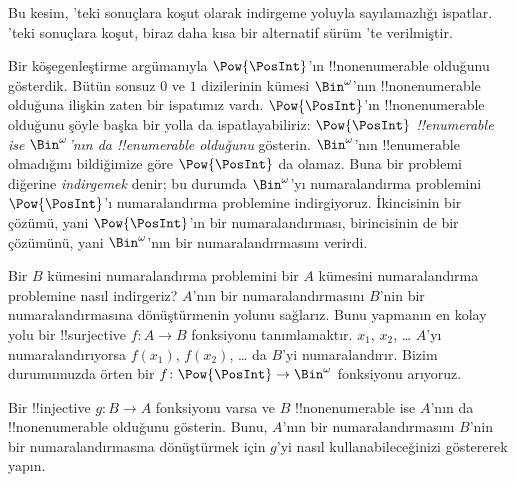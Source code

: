 \documentclass[../../../include/open-logic-section]{subfiles}
\begin{document}


\begin{editorial}
  Bu kesim, 'teki sonuçlara koşut olarak indirgeme yoluyla
  sayılamazlığı ispatlar. 'teki sonuçlara koşut, biraz
  daha kısa bir alternatif sürüm 'te verilmiştir.
\end{editorial}

Bir köşegenleştirme argümanıyla $\Pow{\PosInt}$'ın !!{nonenumerable}
olduğunu gösterdik. Bütün sonsuz $0$ ve $1$ dizilerinin kümesi
$\Bin^\omega$'nın !!{nonenumerable} olduğuna ilişkin zaten bir ispatımız
vardı. $\Pow{\PosInt}$'ın !!{nonenumerable} olduğunu şöyle başka bir yolla
da ispatlayabiliriz: \emph{$\Pow{\PosInt}$ !!{enumerable} ise
$\Bin^\omega$'nın da !!{enumerable} olduğunu} gösterin. $\Bin^\omega$'nın
!!{enumerable} olmadığını bildiğimize göre $\Pow{\PosInt}$ da olamaz. Buna
bir problemi diğerine \emph{indirgemek} denir; bu durumda $\Bin^\omega$'yı
numaralandırma problemini $\Pow{\PosInt}$'ı numaralandırma problemine
indirgiyoruz. İkincisinin bir çözümü, yani $\Pow{\PosInt}$'ın bir
numaralandırması, birincisinin de bir çözümünü, yani $\Bin^\omega$'nın bir
numaralandırmasını verirdi.

Bir $B$ kümesini numaralandırma problemini bir $A$ kümesini numaralandırma
problemine nasıl indirgeriz? $A$'nın bir numaralandırmasını $B$'nin bir
numaralandırmasına dönüştürmenin yolunu sağlarız. Bunu yapmanın en kolay yolu
bir !!{surjective} $f\colon A\to B$ fonksiyonu tanımlamaktır. $x_1$, $x_2$,
\dots{} $A$'yı numaralandırıyorsa $f(x_1)$, $f(x_2)$, \dots{} da $B$'yi
numaralandırır. Bizim durumumuzda örten bir $f\colon\Pow{\PosInt}\to
\Bin^\omega$ fonksiyonu arıyoruz.

\begin{prob}
Bir !!{injective} $g\colon B\to A$ fonksiyonu varsa ve $B$
!!{nonenumerable} ise $A$'nın da !!{nonenumerable} olduğunu gösterin. Bunu,
$A$'nın bir numaralandırmasını $B$'nin bir numaralandırmasına dönüştürmek
için $g$'yi nasıl kullanabileceğinizi göstererek yapın.
\end{prob}
\end{document}
